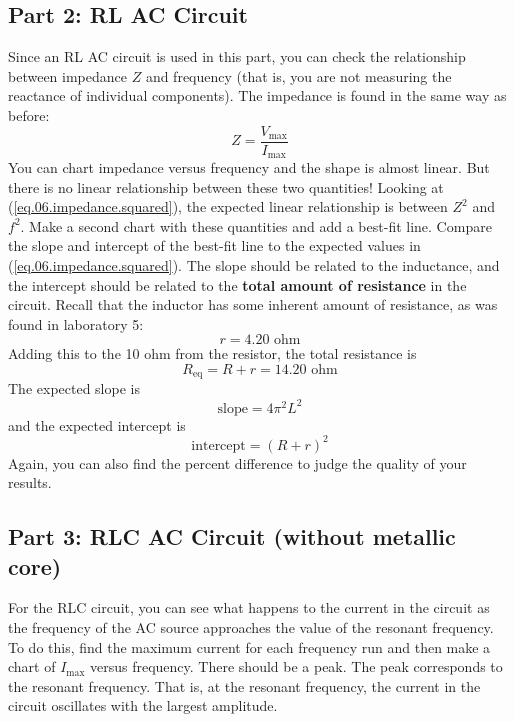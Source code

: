 \subsection{Part 2: RL AC Circuit}
Since an RL AC circuit is used in this part, you can check the relationship between impedance $Z$ and frequency (that is, you are not measuring the reactance of individual components). The impedance is found in the same way as before:
\begin{equation}
	Z = \frac{V_{\text{max}}}{I_{\text{max}}}
\end{equation}
You can chart impedance versus frequency and the shape is almost linear. But there is no linear relationship between these two quantities! Looking at (\ref{eq.06.impedance.squared}), the expected linear relationship is between $Z^{2}$ and $f^{2}$. Make a second chart with these quantities and add a best-fit line. Compare the slope and intercept of the best-fit line to the expected values in (\ref{eq.06.impedance.squared}). The slope should be related to the inductance, and the intercept should be related to the \textbf{total amount of resistance} in the circuit. Recall that the inductor has some inherent amount of resistance, as was found in laboratory 5:
\begin{equation}
	r = 4.20 \text{ ohm}
\end{equation}
Adding this to the 10 ohm from the resistor, the total resistance is
\begin{equation}
	R_{\text{eq}} = R + r = 14.20 \text{ ohm}
\end{equation}
The expected slope is
\begin{equation}
	\text{slope} = 4 \pi^{2} L^{2}
\end{equation}
and the expected intercept is
\begin{equation}
	\text{intercept} = (R + r)^{2}
\end{equation}
Again, you can also find the percent difference to judge the quality of your results.
\subsection{Part 3: RLC AC Circuit (without metallic core)}
For the RLC circuit, you can see what happens to the current in the circuit as the frequency of the AC source  approaches the value of the resonant frequency. To do this, find the maximum current for each frequency run and then make a chart of $I_{\text{max}}$ versus frequency. There should be a peak. The peak corresponds to the resonant frequency. That is, at the resonant frequency, the current in the circuit oscillates with the largest amplitude.

